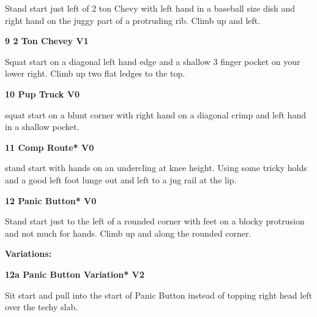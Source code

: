 \begin{multicols}{2}
			\begin{adjustwidth}{0.5cm}{}				
			Stand start just left of 2 ton Chevy with left hand in a baseball size dish and right hand on the juggy part of a protruding rib. Climb up and left.
			\end{adjustwidth}
			\label{rt:2 Ton Chevey}
\colorbox{green!20}{
\parbox{0.95\linewidth}{
\textbf{
9 2 Ton Chevey V1  
}
}
}

			\begin{adjustwidth}{0.5cm}{}				
			Squat start on a diagonal left hand edge and a shallow 3 finger pocket on your lower right. Climb up two flat ledges to the top.
			\end{adjustwidth}
			\label{rt:Pup Truck}
\colorbox{green!20}{
\parbox{0.95\linewidth}{
\textbf{
10 Pup Truck V0  
}
}
}

			\begin{adjustwidth}{0.5cm}{}				
			squat start on a blunt corner with right hand on a diagonal crimp and left hand in a shallow pocket.
			\end{adjustwidth}

			\label{rt:Comp Route}
\colorbox{green!20}{
\parbox{0.95\linewidth}{
\textbf{
11 Comp Route* V0  
}
}
}

			\begin{adjustwidth}{0.5cm}{}				
			stand start with hands on an undercling at knee height. Using some tricky holds and a good left foot lunge out and left to a jug rail at the lip.
			\end{adjustwidth}
			\label{rt:Panic Button}
\colorbox{green!20}{
\parbox{0.95\linewidth}{
\textbf{
12 Panic Button* V0  
}
}
}

			\begin{adjustwidth}{0.5cm}{}				
			Stand start just to the left of a rounded corner with feet on a blocky protrusion and not much for hands. Climb up and along the rounded corner.
			\end{adjustwidth}
				\begin{adjustwidth}{0.5cm}{}				
				\textbf{Variations:} \newline
					\label{vr:Panic Button Variation}
\colorbox{green!20}{
\parbox{0.95\linewidth}{
\textbf{
12a Panic Button Variation* V2  
}
}
}

					\begin{adjustwidth}{0.5cm}{}				
					Sit start and pull into the start of Panic Button instead of topping right head left over the techy slab.
					\end{adjustwidth}
				\end{adjustwidth}

\end{multicols}
